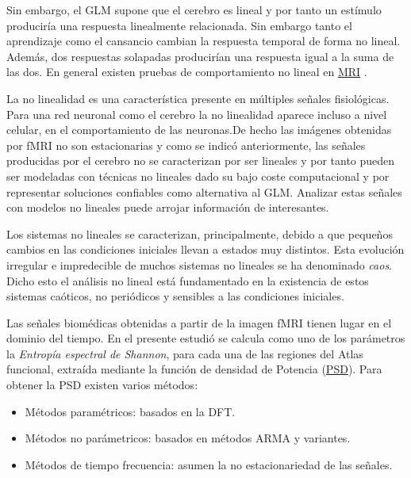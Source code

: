 Sin embargo, el GLM supone que el cerebro es lineal y por tanto un estímulo produciría una respuesta linealmente relacionada. Sin embargo tanto el aprendizaje como el cansancio cambian la respuesta temporal de forma no lineal. Además, dos respuestas solapadas producirían una respuesta igual a la suma de las dos. En general existen pruebas de comportamiento no lineal en \hyperref[glos:mri]{MRI} \cite{tesis}.

La no linealidad es una característica presente en múltiples señales fisiológicas. Para una red neuronal como el cerebro la no linealidad aparece incluso a nivel celular, en el comportamiento de las neuronas.De hecho las imágenes obtenidas por fMRI no son estacionarias y como se indicó anteriormente, las señales producidas por el cerebro no se caracterizan por ser lineales y por tanto pueden ser modeladas con técnicas no lineales dado su bajo coste computacional y por representar soluciones confiables como alternativa al GLM. Analizar estas señales con modelos no lineales puede arrojar información de interesantes.

Los sistemas no lineales se caracterizan, principalmente, debido a que pequeños cambios en las condiciones iniciales llevan a estados muy distintos. Esta evolución irregular e impredecible de muchos sistemas no lineales se ha denominado \textit{caos}. Dicho esto el análisis no lineal está fundamentado en la existencia de estos sistemas caóticos, no periódicos y sensibles a las condiciones iniciales.

Las señales biomédicas obtenidas a partir de la imagen fMRI tienen lugar en el dominio del tiempo. En el presente estudió se calcula como uno de los parámetros la \textit{Entropía espectral de Shannon}, para cada una de las regiones del Atlas funcional, extraída mediante la función de densidad de Potencia (\hyperref[glos:psd]{PSD}). Para obtener la PSD existen varios métodos:
\begin{itemize}
\item Métodos paramétricos: basados en la DFT.
\item Métodos no parámetricos: basados en métodos ARMA y variantes.
\item Métodos de tiempo frecuencia: asumen la no estacionariedad de las señales.
\end{itemize}